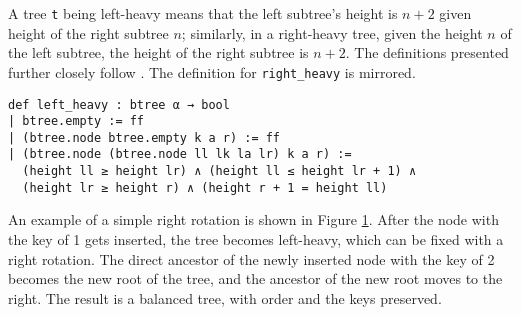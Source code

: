A tree \lstinline{t} being left-heavy means that the left subtree's height is $n+2$ given height of the right subtree $n$; similarly, in a right-heavy tree, given the height $n$ of the left subtree, the height of the right subtree is $n+2$. The definitions presented further closely follow \cite{textbook:discrete_computer}. The definition for \lstinline{right_heavy} is mirrored.

\begin{lstlisting}
def left_heavy : btree α → bool
| btree.empty := ff
| (btree.node btree.empty k a r) := ff
| (btree.node (btree.node ll lk la lr) k a r) :=
  (height ll ≥ height lr) ∧ (height ll ≤ height lr + 1) ∧
  (height lr ≥ height r) ∧ (height r + 1 = height ll)
\end{lstlisting}

\begin{figure}[!ht]
  \begin{subfigure}[c]{0.3\textwidth}
    \centering
  \end{subfigure}%
  \begin{subfigure}{0.3\textwidth}
    \centering
  \end{subfigure}%
  \begin{subfigure}[c]{0.3\textwidth}
    \centering
  \end{subfigure}
  \caption{}
  \label{fig:rotation}
\end{figure}

An example of a simple right rotation is shown in Figure \ref{fig:rotation}. After the node with the key of 1 gets inserted, the tree becomes left-heavy, which can be fixed with a right rotation. The direct ancestor of the newly inserted node with the key of 2 becomes the new root of the tree, and the ancestor of the new root moves to the right. The result is a balanced tree, with order and the keys preserved.

